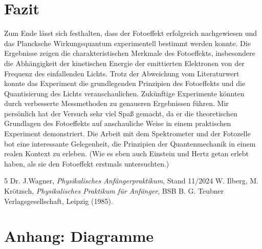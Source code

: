 \documentclass[12pt,a4paper,titlepage]{scrartcl}
\numberwithin{equation}{section}
\numberwithin{table}{section}
\numberwithin{figure}{section}
\begin{document}
\section{Fazit}
Zum Ende lässt sich festhalten, dass der Fotoeffekt erfolgreich nachgewiesen und das Plancksche Wirkungsquantum experimentell bestimmt werden konnte. Die Ergebnisse zeigen die charakteristischen Merkmale des Fotoeffekts, insbesondere die Abhängigkeit der kinetischen Energie der emittierten Elektronen von der Frequenz des einfallenden Lichts. Trotz der Abweichung vom Literaturwert konnte das Experiment die grundlegenden Prinzipien des Fotoeffekts und die Quantisierung des Lichts veranschaulichen. Zukünftige Experimente könnten durch verbesserte Messmethoden zu genaueren Ergebnissen führen. Mir persönlich hat der Versuch sehr viel Spaß gemacht, da er die theoretischen Grundlagen des Fotoeffekts auf anschauliche Weise in einem praktischen Experiment demonstriert. Die Arbeit mit dem Spektrometer und der Fotozelle bot eine interessante Gelegenheit, die Prinzipien der Quantenmechanik in einem realen Kontext zu erleben. (Wie es eben auch Einstein und Hertz getan erlebt haben, als sie den Fotoeffekt erstmals untersuchten.)
\clearpage

\listoffigures


\listoftables

\begin{thebibliography}{5}
     Dr. J.Wagner, \emph{Physikalisches Anfängerpraktikum}, Stand 11/2024
     W. Ilberg, M. Krötzsch, \emph{Physikalisches Praktikum für Anfänger}, BSB B. G. Teubner Verlagsgesellschaft, Leipzig (1985).
\end{thebibliography}

\appendix
\section{Anhang: Diagramme}




\end{document}
